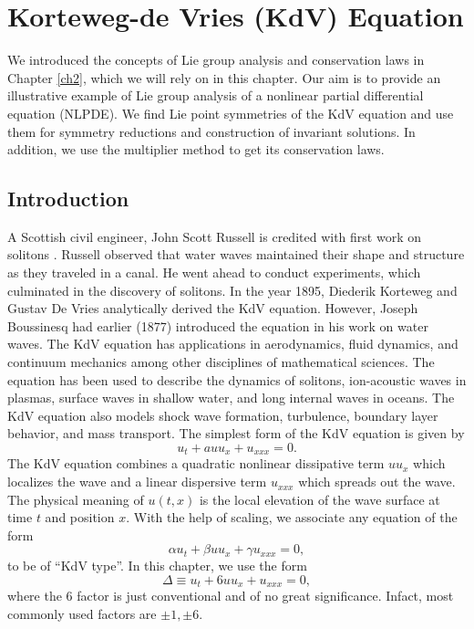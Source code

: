 \chapter{Korteweg-de Vries (KdV)  Equation \label{ch3}}
We introduced the concepts of Lie group analysis and conservation laws in Chapter \ref{ch2}, which we will rely on in this chapter. Our aim is to provide an illustrative example of Lie group analysis of a nonlinear partial differential equation (NLPDE). We find  Lie point symmetries of the KdV equation and use them for symmetry reductions and construction of invariant solutions. In addition, we use the multiplier method to get its conservation laws.
\section{Introduction}
A Scottish civil engineer, John Scott Russell is credited with first work on solitons \citep{wazwaz2010partial}. Russell observed that water waves maintained their shape and structure as they traveled in a canal. He went ahead to conduct experiments, which culminated in the discovery of solitons.
In the year 1895, Diederik Korteweg and Gustav De Vries analytically derived the  KdV equation. However,  Joseph  Boussinesq had earlier (1877) introduced the equation in his work on water waves. The KdV equation has applications in aerodynamics, fluid dynamics, and continuum mechanics among other disciplines of mathematical sciences. The equation has been used to describe the dynamics of solitons, ion-acoustic waves in plasmas, surface waves in shallow water, and long internal waves in oceans. The KdV equation also models shock wave formation, turbulence, boundary layer behavior, and mass transport. The simplest form of the KdV equation is  given by \begin{equation}
u_t + a uu_x + u_{xxx} =0.  \label{ew0}\end{equation} The KdV equation combines a quadratic nonlinear dissipative term $uu_x$ which localizes the wave and a linear dispersive term $u_{xxx}$ which spreads  out the wave. The physical meaning  of $u(t,x)$ is the local elevation of the wave surface  at time $t$ and position $x$. With the help of scaling, we associate any equation of the form
\begin{equation}
\alpha u_{t}+\beta u u_{x}+ \gamma u_{xxx}=0,
\end{equation}
to be of “KdV type”.  In this chapter, we use the  form
\begin{equation}\label{kd}
\Delta \equiv  u_{t}+6u u_{x}+ u_{xxx}=0,
\end{equation} where the 6 factor is just conventional and of no great significance. Infact, most commonly used factors are $ \pm 1 , \pm 6.$
